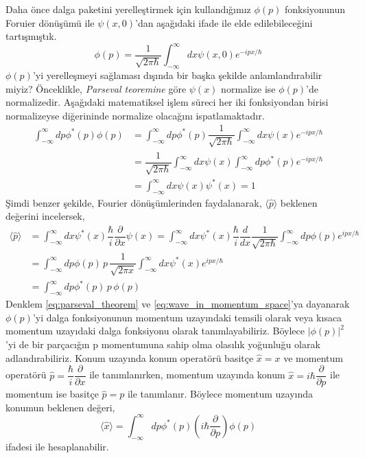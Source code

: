 \documentclass[a4paper,12pt, twoside]{article}
\begin{document}
Daha önce dalga paketini yerelleştirmek için kullandığımız $\phi(p)$ fonksiyonunun Foruier dönüşümü ile $\psi(x,0)$'dan aşağıdaki ifade ile elde edilebileceğini tartışmıştık.
\begin{equation}
\phi \left( p\right) =\dfrac {1}{\sqrt {2\pi \hbar }}\int ^{\infty }_{-\infty }dx\psi \left( x,0\right) e^{-ipx/\hbar }
\end{equation}
$\phi(p)$'yi yerelleşmeyi sağlaması dışında bir başka şekilde anlamlandırabilir miyiz? Önceklikle, \emph{Parseval teoremine} göre $\psi(x)$ normalize ise $\phi(p)$'de normalizedir. Aşağıdaki matematiksel işlem süreci her iki fonksiyondan birisi normalizeyse diğerininde normalize olacağını ispatlamaktadır.
\begin{align}
\int ^{\infty }_{-\infty }dp\phi ^{\ast }\left( p\right) \phi \left( p\right) &=\int ^{\infty }_{-\infty }dp\phi ^{\ast }\left( p\right) \dfrac {1}{\sqrt {2\pi \hbar }}\int ^{\infty }_{-\infty }dx\psi \left( x\right) e^{-ipx/\hbar }\nonumber \\
&=\dfrac {1}{\sqrt {2\pi \hbar }}\int ^{\infty }_{-\infty }dx\psi \left( x\right) \int ^{\infty }_{-\infty }dp\phi^\ast \left( p\right) e^{-ipx/\hbar }\nonumber \\
&=\int ^{\infty }_{-\infty }dx\psi \left( x\right) \psi ^{\ast }\left( x\right) = 1
\label{eq:parseval_theorem}
\end{align}
Şimdi benzer şekilde, Fourier dönüşümlerinden faydalanarak, $\langle \hat p \rangle$ beklenen değerini incelersek,
\begin{align}
\langle \hat p\rangle &=\int ^{\infty }_{-\infty }dx\psi^\ast \left( x\right) \dfrac {\hbar }{i}\dfrac {\partial}{\partial x}\psi \left( x\right) =\int ^{\infty }_{-\infty }dx\psi^\ast \left( x\right) \dfrac {\hbar }{i}\dfrac {d}{dx}\dfrac {1}{\sqrt {2\pi \hbar }}\int ^{\infty }_{-\infty }dp\phi \left( p\right) e^{ipx/\hbar }\nonumber \\
&=\int ^{\infty }_{-\infty }dp\phi \left( p\right) \,p\, \dfrac {1}{\sqrt {2\pi x}}\int ^{\infty }_{-\infty }dx\psi ^{\ast }\left( x\right) e^{ipx/\hbar }\nonumber \\
&= \int ^{\infty }_{-\infty }dp\phi ^{\ast }(p)\,p\,\phi(p)
\label{eq:wave_in_momentum_space} 
\end{align}
Denklem \ref{eq:parseval_theorem} ve \ref{eq:wave_in_momentum_space}'ya dayanarak $\phi(p)$'yi dalga fonksiyonunun momentum uzayındaki temsili olarak veya kısaca momentum uzayıdaki dalga fonksiyonu olarak tanımlayabiliriz. Böylece $|\phi(p)|^2$'yi de bir parçacığın p momentumuna sahip olma olasılık yoğunluğu olarak adlandırabiliriz. Konum uzayında konum operatörü basitçe $\hat x = x$ ve momentum operatörü $\hat p = \dfrac{\hbar}{i}\dfrac{\partial}{\partial x}$ ile tanımlanırken, momentum uzayında konum $\hat x = i \hbar\dfrac{\partial}{\partial p}$ ile momentum ise basitçe $\hat p = p$ ile tanımlanır. Böylece momentum uzayında konumun beklenen değeri,
\begin{equation}
\langle \hat x \rangle =  \int ^{\infty }_{-\infty }dp\phi ^{\ast }(p)\left(i\hbar\dfrac{\partial}{\partial p}\right)\phi(p)
\end{equation}
ifadesi ile hesaplanabilir.
\end{document}
